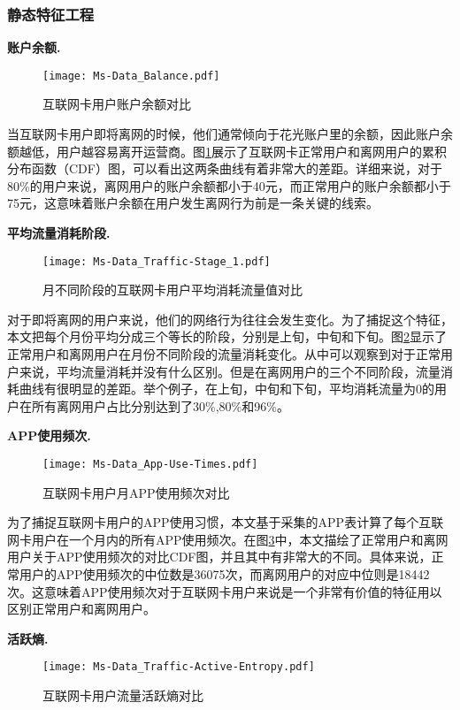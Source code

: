 \subsubsection{静态特征工程}
\textbf{账户余额.}
\begin{figure}[hbt]
	\centering
	\texttt{[image: Ms-Data\_Balance.pdf]}
	\caption{互联网卡用户账户余额对比}
	\label{Fig:Balance}
\end{figure}
当互联网卡用户即将离网的时候，他们通常倾向于花光账户里的余额，因此账户余额越低，用户越容易离开运营商。图\ref{Fig:Balance}展示了互联网卡正常用户和离网用户的累积分布函数（CDF）图，可以看出这两条曲线有着非常大的差距。详细来说，对于80\%的用户来说，离网用户的账户余额都小于40元，而正常用户的账户余额都小于75元，这意味着账户余额在用户发生离网行为前是一条关键的线索。

\par

\textbf{平均流量消耗阶段.}
\begin{figure}[hbt]
	\centering
	\texttt{[image: Ms-Data\_Traffic-Stage\_1.pdf]}
	\caption{月不同阶段的互联网卡用户平均消耗流量值对比}
	\label{Fig:Traffic-Stage}
\end{figure}
对于即将离网的用户来说，他们的网络行为往往会发生变化。为了捕捉这个特征，本文把每个月份平均分成三个等长的阶段，分别是上旬，中旬和下旬。图\ref{Fig:Traffic-Stage}显示了正常用户和离网用户在月份不同阶段的流量消耗变化。从中可以观察到对于正常用户来说，平均流量消耗并没有什么区别。但是在离网用户的三个不同阶段，流量消耗曲线有很明显的差距。举个例子，在上旬，中旬和下旬，平均消耗流量为0的用户在所有离网用户占比分别达到了30\%,80\%和96\%。
\par

\textbf{APP使用频次.}
\begin{figure}[hbt]
	\centering
	\texttt{[image: Ms-Data\_App-Use-Times.pdf]}
	\caption{互联网卡用户月APP使用频次对比}
	\label{Fig:App-Use-Times}
\end{figure}
为了捕捉互联网卡用户的APP使用习惯，本文基于采集的APP表计算了每个互联网卡用户在一个月内的所有APP使用频次。在图\ref{Fig:App-Use-Times}中，本文描绘了正常用户和离网用户关于APP使用频次的对比CDF图，并且其中有非常大的不同。具体来说，正常用户的APP使用频次的中位数是36075次，而离网用户的对应中位则是18442次。这意味着APP使用频次对于互联网卡用户来说是一个非常有价值的特征用以区别正常用户和离网用户。
\par




\textbf{活跃熵.}
\begin{figure}[hbt]
	\centering
	\texttt{[image: Ms-Data\_Traffic-Active-Entropy.pdf]}
	\caption{互联网卡用户流量活跃熵对比}
	\label{Active-Entropy}
\end{figure}

